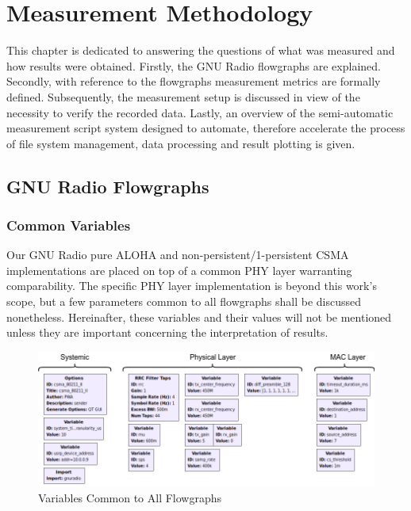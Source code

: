 \chapter{Measurement Methodology}

This chapter is dedicated to answering the questions of what was measured and how results were obtained. Firstly, the GNU Radio flowgraphs are explained. Secondly, with reference to the flowgraphs measurement metrics are formally defined. Subsequently, the measurement setup is discussed in view of the necessity to verify the recorded data. Lastly, an overview of the semi-automatic measurement script system designed to automate, therefore accelerate the process of file system management, data processing and result plotting is given.

\bigskip

\section{GNU Radio Flowgraphs}

\subsection{Common Variables}

Our GNU Radio pure ALOHA and non-persistent/1-persistent CSMA implementations are placed on top of a common PHY layer warranting comparability. The specific PHY layer implementation is beyond this work's scope, but a few parameters common to all flowgraphs shall be discussed nonetheless. Hereinafter, these variables and their values will not be mentioned unless they are important concerning the interpretation of results.

\begin{figure}[ht]
	\label{fig:grc-common-variables}
	\begin{center}
		\includegraphics[width=\textwidth]{pictures/grc_common_variables}
	\end{center}
\caption{Variables Common to All Flowgraphs}
\end{figure}     

